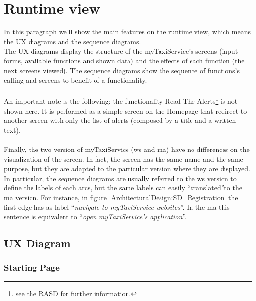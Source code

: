 \documentclass[\mainpath/main]{subfiles}
\begin{document}
\section{Runtime view}
\label{ArchitecturalDesign:runtime}

In this paragraph we'll show the main features on the runtime view, which means the UX diagrams and the sequence diagrams.\\
The UX diagrams display the structure of the myTaxiService's screens (input forms, available functions and shown data) and the effects of each function (the next screens viewed). The sequence diagrams show the sequence of functions's calling and screens to benefit of a functionality.\\
\\
An important note is the following: the functionality Read The Alerts\footnote{see the RASD for further information.} is not shown here. It is performed as a simple screen on the Homepage that redirect to another screen with only the list of alerts (composed by a title and a written text).\\
\\
Finally, the two version of myTaxiService (\gls{ws} and \gls{ma}) have no differences on the visualization of the screen. In fact, the screen has the same name and the same purpose, but they are adapted to the particular version where they are displayed.\\
In particular, the sequence diagrams are usually referred to the \gls{ws} version to define the labels of each arcs, but the same labels can easily \textquotedblleft translated\textquotedblright to the \gls{ma} version. For instance, in figure \ref{ArchitecturalDesign:SD_Registration} the first edge has as label \textquotedblleft \textit{navigate to myTaxiService websites}\textquotedblright . In the \gls{ma} this sentence is equivalent to \textquotedblleft \textit{open myTaxiService's application}\textquotedblright .


\subsection{UX Diagram}
\label{ArchitecturalDesign:UX}

\subsubsection{Starting Page}
\label{ArchitecturalDesign:UX_StartingPage}
\end{document}
